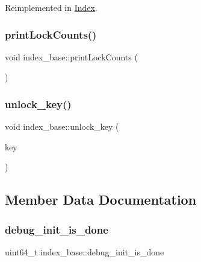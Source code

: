 Reimplemented in \hyperlink{classIndex_ab300e132e8a12e3334003227a2e3f618}{Index}.

\mbox{\label{classindex__base_ad8ff262d6b034e6de86651ef8f736cbb}} 
\subsubsection{\texorpdfstring{print\+Lock\+Counts()}{printLockCounts()}}
{\footnotesize\ttfamily void index\+\_\+base\+::print\+Lock\+Counts (\begin{DoxyParamCaption}{ }\end{DoxyParamCaption})\hspace{0.3cm}{\ttfamily [inline]}}

\mbox{\label{classindex__base_a6907aa960cab70f4693bf10891efa0b8}} 
\subsubsection{\texorpdfstring{unlock\+\_\+key()}{unlock\_key()}}
{\footnotesize\ttfamily void index\+\_\+base\+::unlock\+\_\+key (\begin{DoxyParamCaption}\item[{\hyperlink{index__base_8h_ae35c40bc2f912c11f0e36ac66cba4489}{K\+E\+Y\+\_\+\+T\+Y\+PE}}]{key }\end{DoxyParamCaption})\hspace{0.3cm}{\ttfamily [inline]}}



\subsection{Member Data Documentation}
\mbox{\label{classindex__base_ad7276d1faf3b802ddd3ed0a0e8442e3f}} 
\subsubsection{\texorpdfstring{debug\+\_\+init\+\_\+is\+\_\+done}{debug\_init\_is\_done}}
{\footnotesize\ttfamily uint64\+\_\+t index\+\_\+base\+::debug\+\_\+init\+\_\+is\+\_\+done\hspace{0.3cm}{\ttfamily [protected]}}

